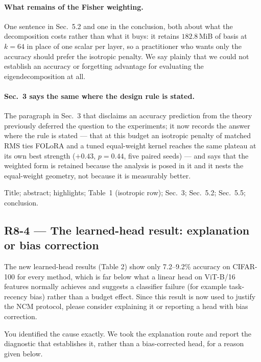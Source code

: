 \paragraph{What remains of the Fisher weighting.} One sentence in Sec.~5.2
and one in the conclusion, both about what the decom\-position costs rather than what it
buys: it retains $182.8$\,MiB of basis at $k{=}64$ in place of one scalar per layer, so a
practitioner who wants only the accuracy should prefer the isotropic penalty. We say plainly
that we could not establish an accuracy or forgetting advantage for evaluating the
eigendecomposition at all.

\paragraph{Sec.~3 says the same where the design rule is stated.} The paragraph in
Sec.~3 that disclaims an accuracy prediction from the theory previously
deferred the question to the experiments; it now records the answer where the rule is
stated --- that at this budget an isotropic penalty of matched RMS ties FOLoRA and a tuned
equal-weight kernel reaches the same plateau at its own best strength ($+0.43$, $p=0.44$,
five paired seeds) --- and says that the weighted form is
retained because the analysis is posed in it and it nests the equal-weight geometry, not
because it is measurably better.

\change Title; abstract; highlights; Table~1 (isotropic row); Sec.~3;
Sec.~5.2; Sec.~5.5; conclusion.

\subsection*{R8-4 --- The learned-head result: explanation or bias correction}

\begin{rquote}
The new learned-head results (Table 2) show only 7.2--9.2\% accuracy on CIFAR-100 for every
method, which is far below what a linear head on ViT-B/16 features normally achieves and
suggests a classifier failure (for example task-recency bias) rather than a budget effect.
Since this result is now used to justify the NCM protocol, please consider explaining it or
reporting a head with bias correction.
\end{rquote}

\resp You identified the cause exactly. We took the explanation route and report the diagnostic
that establishes it, rather than a bias-corrected head, for a reason given below.

